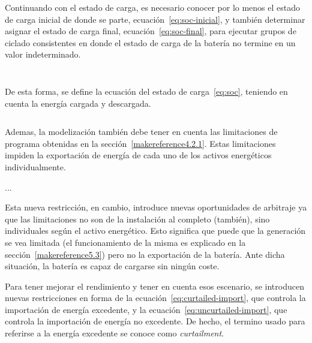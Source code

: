 \begin{equation}
  \label{eq:limite-soc}
\end{equation}

Continuando con el estado de carga, es necesario conocer por lo menos el estado de carga inicial de donde se parte, ecuación~\ref{eq:soc-inicial}, y también determinar asignar el estado de carga final, ecuación~\ref{eq:soc-final}, para ejecutar grupos de ciclado consistentes en donde el estado de carga de la batería no termine en un valor indeterminado.

\begin{equation}
  \label{eq:soc-inicial}
\end{equation}

\begin{equation}
  \label{eq:soc-final}
\end{equation}

De esta forma, se define la ecuación del estado de carga~\ref{eq:soc}, teniendo en cuenta la energía cargada y descargada.

\begin{equation}
  \label{eq:soc}
\end{equation}

Ademas, la modelización también debe tener en cuenta las limitaciones de programa obtenidas en la sección~\ref{makereference4.2.1}. Estas limitaciones impiden la exportación de energía de cada uno de los activos energéticos individualmente.

...

Esta nueva restricción, en cambio, introduce nuevas oportunidades de arbitraje ya que las limitaciones no son de la instalación al completo (también), sino individuales según el activo energético. Esto significa que puede que la generación se vea limitada (el funcionamiento de la misma es explicado en la sección~\ref{makereference5.3}) pero no la exportación de la batería. Ante dicha situación, la batería es capaz de cargarse sin ningún coste.

Para tener mejorar el rendimiento y tener en cuenta esos escenario, se introducen nuevas restricciones en forma de la ecuación~\ref{eq:curtailed-import}, que controla la importación de energía excedente, y la ecuación~\ref{eq:uncurtailed-import}, que controla la importación de energía no excedente. De hecho, el termino usado para referirse a la energía excedente se conoce como \textit{curtailment}.

\begin{equation}
  \label{eq:curtailed-import}
\end{equation}


